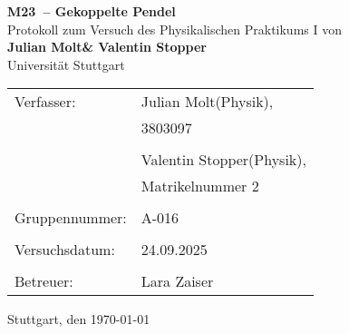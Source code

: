 \documentclass[
12pt,
a4paper,
bibliography=totocnumbered, %
twoside, %
BCOR=1cm, %
]{scrartcl}
\numberwithin{equation}{section} %
\newcommand{\VERSUCHSDATUM}{24.09.2025}
\newcommand{\PROTOKOLLDATUM}{\today}
\newcommand{\VerfasserEINS}{Julian Molt}
\newcommand{\MatNoEINS}{3803097}
\newcommand{\StudiengangEINS}{Physik}
\newcommand{\VerfasserZWEI}{Valentin Stopper}
\newcommand{\MatNoZWEI}{Matrikelnummer 2}
\newcommand{\StudiengangZWEI}{Physik}
\newcommand{\BETREUER}{Lara Zaiser}
\newcommand{\GRUPPENNR}{A-016}
\newcommand{\VERSUCHSNR}{M23}
\newcommand{\VERSUCHSNAME}{Gekoppelte Pendel}
\begin{document}
	\thispagestyle{empty}


	\begin{titlepage}

		\begin{center}
			\Huge{\textbf{\VERSUCHSNR\ -- \VERSUCHSNAME}}\\
			\vspace{10mm}
			\Large{Protokoll zum Versuch des Physikalischen Praktikums I von \\ \textbf{\VerfasserEINS\;\& \VerfasserZWEI}}\\
			\vspace{10mm}
			\Large{Universität Stuttgart}\\
		\end{center}
		\vspace{1cm}
		\begin{center}
			\begin{tabular}{ll}
				\large{Verfasser:}		& \large{\VerfasserEINS\;(\StudiengangEINS),} \\
				& \large{\MatNoEINS} \\
				\vspace{0cm}\\
				& \large{\VerfasserZWEI\;(\StudiengangZWEI),} \\
				& \large{\MatNoZWEI} \\
				\vspace{0cm}\\
				\large{Gruppennummer:}	& \large{\GRUPPENNR} \\
				\vspace{0cm}\\
				\large{Versuchsdatum:}	& \large{\VERSUCHSDATUM} \\
				\vspace{0cm}\\
				\large{Betreuer:}		& \large{\BETREUER}
			\end{tabular}
		\end{center}
		\vspace{15mm}

		\begin{center}
			Stuttgart, den \PROTOKOLLDATUM
		\end{center}

	\end{titlepage}


\thispagestyle{empty}

\tableofcontents

\clearpage %
\end{document}
